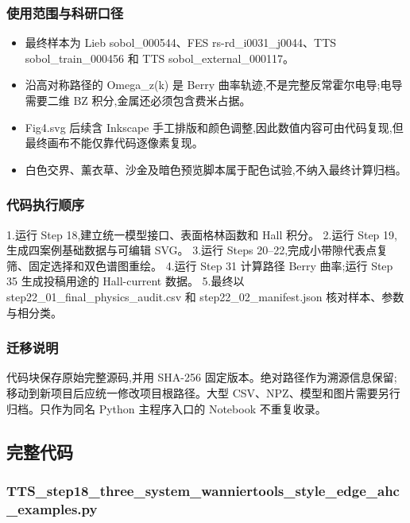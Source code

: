 \documentclass[lang=cn,scheme=chinese,color=blue,device=normal,toc=onecol,math=cm]{elegantbook}
\begin{document}
\subsubsection{使用范围与科研口径}


\begin{itemize}
\item 最终样本为 Lieb sobol\_\allowbreak{}000544、FES rs-rd\_\allowbreak{}i0031\_\allowbreak{}j0044、TTS sobol\_\allowbreak{}train\_\allowbreak{}000456 和 TTS sobol\_\allowbreak{}external\_\allowbreak{}000117。
\item 沿高对称路径的 Omega\_\allowbreak{}z(k) 是 Berry 曲率轨迹,不是完整反常霍尔电导;电导需要二维 BZ 积分,金属还必须包含费米占据。
\item Fig4.svg 后续含 Inkscape 手工排版和颜色调整,因此数值内容可由代码复现,但最终画布不能仅靠代码逐像素复现。
\item 白色交界、薰衣草、沙金及暗色预览脚本属于配色试验,不纳入最终计算归档。
\end{itemize}


\subsubsection{代码执行顺序}


1.运行 Step 18,建立统一模型接口、表面格林函数和 Hall 积分。 2.运行 Step 19,生成四案例基础数据与可编辑 SVG。 3.运行 Steps 20–22,完成小带隙代表点复筛、固定选择和双色谱图重绘。 4.运行 Step 31 计算路径 Berry 曲率;运行 Step 35 生成投稿用途的 Hall-current 数据。 5.最终以 step22\_\allowbreak{}01\_\allowbreak{}final\_\allowbreak{}physics\_\allowbreak{}audit.csv 和 step22\_\allowbreak{}02\_\allowbreak{}manifest.json 核对样本、参数与相分类。\par


\subsubsection{迁移说明}


代码块保存原始完整源码,并用 SHA-256 固定版本。绝对路径作为溯源信息保留;移动到新项目后应统一修改项目根路径。大型 CSV、NPZ、模型和图片需要另行归档。只作为同名 Python 主程序入口的 Notebook 不重复收录。\par


\subsection{完整代码}


\subsubsection{TTS\_\allowbreak{}step18\_\allowbreak{}three\_\allowbreak{}system\_\allowbreak{}wanniertools\_\allowbreak{}style\_\allowbreak{}edge\_\allowbreak{}ahc\_\allowbreak{}examples.py}
\end{document}
